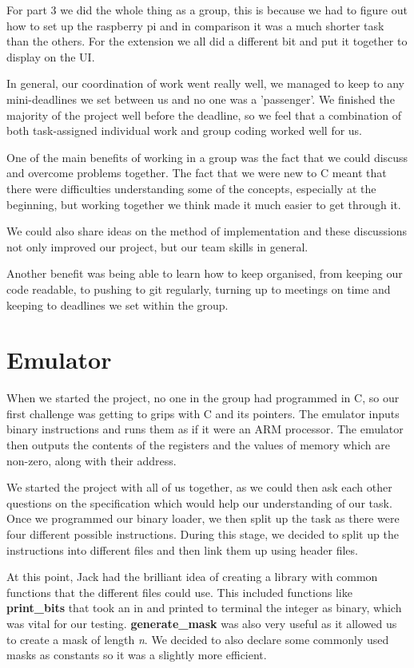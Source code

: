 \documentclass[11pt]{article}
\begin{document}
For part 3 we did the whole thing as a group, this is because we had to figure out how to set up the raspberry pi and in comparison it was a much shorter task than the others. For the extension we all did a different bit and put it together to display on the UI.

In general, our coordination of work went really well, we managed to keep to any mini-deadlines we set between us and no one was a 'passenger'. We finished the majority of the project well before the deadline, so we feel that a combination of both task-assigned individual work and group coding worked well for us.

One of the main benefits of working in a group was the fact that we could discuss and overcome problems together. The fact that we were new to C meant that there were difficulties understanding some of the concepts, especially at the beginning, but working together we think made it much easier to get through it.

We could also share ideas on the method of implementation and these discussions not only improved our project, but our team skills in general.

Another benefit was being able to learn how to keep organised, from keeping our code readable, to pushing to git regularly, turning up to meetings on time and keeping to deadlines we set within the group.

\section{Emulator}
When we started the project, no one in the group had programmed in C, so our first challenge was getting to grips with C and its pointers. The emulator inputs binary instructions and runs them as if it were an ARM processor. The emulator then outputs the contents of the registers and the values of memory which are non-zero, along with their address.

We started the project with all of us together, as we could then ask each other questions on the specification which would help our understanding of our task. Once we programmed our binary loader, we then split up the task as there were four different possible instructions. During this stage, we decided to split up the instructions into different files and then link them up using header files.

At this point, Jack had the brilliant idea of creating a library with common functions that the different files could use. This included functions like {\bf print\_bits} that took an in and printed to terminal the integer as binary, which was vital for our testing. {\bf generate\_mask} was also very useful as it allowed us to create a mask of length {\it n}. We decided to also declare some commonly used masks as constants so it was a slightly more efficient.
\end{document}
